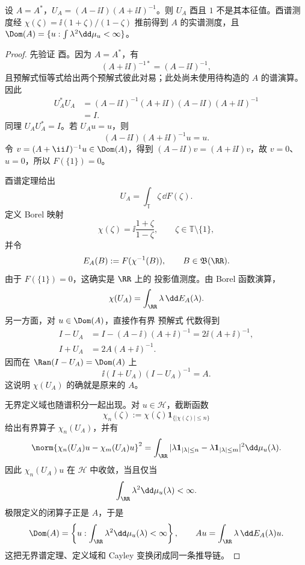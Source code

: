\begin{proposition}
设 $A=A^*$，$U_A=(A-\ii I)(A+\ii I)^{-1}$。则 $U_A$ 酉且 $1$ 不是其本征值。酉谱测度经 $\chi(\zeta)=\ii(1+\zeta)/(1-\zeta)$ 推前得到 $A$ 的实谱测度，且 $\Dom(A)=\{u:\int\lambda^2\dd\mu_u<\infty\}$。
\end{proposition}
\begin{proof}
先验证 酉。因为 $A=A^*$，有
\[
 (A+\ii I)^{-1*}=(A-\ii I)^{-1},
\]
且预解式恒等式给出两个预解式彼此对易；此处尚未使用待构造的 $A$ 的谱演算。因此
\[
\begin{aligned}
 U_A^*U_A
 &=(A-\ii I)^{-1}(A+\ii I)(A-\ii I)(A+\ii I)^{-1}\\
 &=I.
\end{aligned}
\]
同理 $U_AU_A^*=I$。若 $U_Au=u$，则
\[
 (A-\ii I)(A+\ii I)^{-1}u=u.
\]
令 $v=(A+\ii I)^{-1}u\in\Dom(A)$，得到 $(A-\ii I)v=(A+\ii I)v$，故 $v=0$、$u=0$，所以 $F(\{1\})=0$。

酉谱定理给出
\[
 U_A=\int_{\mathbb T}\zeta\,\dd F(\zeta).
\]
定义 Borel 映射
\[
 \chi(\zeta)=\ii\frac{1+\zeta}{1-\zeta},
 \qquad \zeta\in\mathbb T\setminus\{1\},
\]
并令
\[
 E_A(B):=F(\chi^{-1}(B)),\qquad B\in\mathfrak B(\RR).
\]
由于 $F(\{1\})=0$，这确实是 $\RR$ 上的 投影值测度。由 Borel 函数演算，
\[
 \chi(U_A)=\int_{\RR}\lambda\,\dd E_A(\lambda).
\]
另一方面，对 $u\in\Dom(A)$，直接作有界 预解式 代数得到
\[
\begin{aligned}
 I-U_A
 &=I-(A-\ii)(A+\ii)^{-1}
 =2\ii(A+\ii)^{-1},\\
 I+U_A
 &=2A(A+\ii)^{-1}.
\end{aligned}
\]
因而在 $\Ran(I-U_A)=\Dom(A)$ 上
\[
 \ii(I+U_A)(I-U_A)^{-1}=A.
\]
这说明 $\chi(U_A)$ 的确就是原来的 $A$。

无界定义域也随谱积分一起出现。对 $u\in\mathcal H$，截断函数
\[
 \chi_n(\zeta):=\chi(\zeta)\mathbf1_{\{|\chi(\zeta)|\le n\}}
\]
给出有界算子 $\chi_n(U_A)$，并有
\[
 \norm{\chi_n(U_A)u-\chi_m(U_A)u}^2
 =\int_{\RR}|\lambda\mathbf1_{|\lambda|\le n}
 -\lambda\mathbf1_{|\lambda|\le m}|^2\dd\mu_u(\lambda).
\]
因此 $\chi_n(U_A)u$ 在 $\mathcal H$ 中收敛，当且仅当
\[
 \int_{\RR}\lambda^2\dd\mu_u(\lambda)<\infty.
\]
极限定义的闭算子正是 $A$，于是
\begin{equation*}
 \Dom(A)
 =\left\{u:\int_{\RR}\lambda^2\dd\mu_u(\lambda)<\infty\right\},
 \qquad
 Au=\int_{\RR}\lambda\,\dd E_A(\lambda)u.
\end{equation*}
这把无界谱定理、定义域和 Cayley 变换闭成同一条推导链。
\end{proof}


